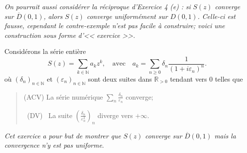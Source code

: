\documentclass[a4paper,10pt]{article}
\newcommand{\N}{\mathbb{N}}
\newcommand{\R}{\mathbb{R}}
\begin{document}
\newpage
\textit{On pourrait aussi considérer la réciproque d'Exercice 4 (e) : si $S(z)$ converge sur $\overline{D}(0,1)$, alors $S(z)$ converge uniformément sur $D(0,1)$. Celle-ci est fausse, cependant le contre-exemple n'est pas facile à construire; voici une construction sous forme d'<< exercice >>.}

\vspace{.1in}
Considérons la série entière
$$S(z)=\sum_{k\in\N}a_kz^k,\quad \text{avec}\quad a_k=\sum_{n\geq 0}\delta_n\frac{1}{(1+i\varepsilon_n)^n}.$$
où $(\delta_n)_{n\in\N}$ et $(\varepsilon_n)_{n\in\N}$ sont deux suites dans $\R_{>0}$ tendant vers 0 telles que
\begin{quote}
    (ACV) La série numérique $\sum_{n}\frac{\delta_n}{\varepsilon_n}$ converge;
    
    ~(DV)~ La suite $(\frac{\delta_n}{\varepsilon_n^2})_{n}$ diverge vers $+\infty$.
\end{quote}
\textit{Cet exercice a pour but de montrer que $S(z)$ converge sur $\overline{D}(0,1)$ mais la convergence n'y est pas uniforme}.
\end{document}

